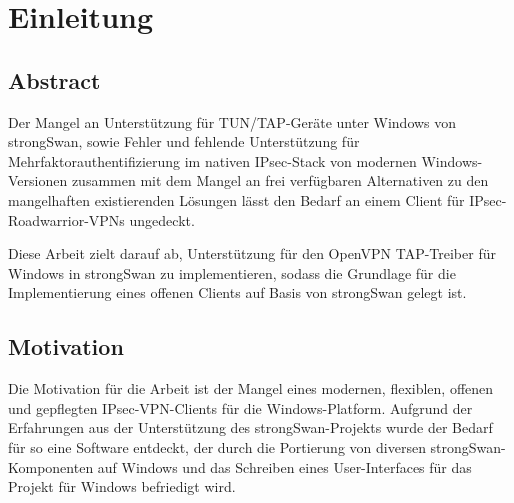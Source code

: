 


\section{Einleitung}
\subsection{Abstract}
Der Mangel an Unterstützung für TUN/TAP-Geräte unter Windows von strongSwan, sowie Fehler und
fehlende Unterstützung für Mehrfaktorauthentifizierung im nativen IPsec-Stack von modernen
Windows-Versionen zusammen mit dem Mangel an frei verfügbaren Alternativen zu den mangelhaften existierenden Lösungen
lässt den Bedarf an einem Client für IPsec-Roadwarrior-VPNs ungedeckt.

Diese Arbeit zielt darauf ab, Unterstützung für den OpenVPN TAP-Treiber
für Windows in strongSwan zu implementieren, sodass die Grundlage für die Implementierung
eines offenen Clients auf Basis von strongSwan gelegt ist.

\subsection{Motivation}
Die Motivation für die Arbeit ist der Mangel eines modernen, flexiblen, offenen
und  gepflegten IPsec-VPN-Clients für die Windows-Platform.
Aufgrund der Erfahrungen aus der Unterstützung des strongSwan-Projekts wurde
der Bedarf für so eine Software entdeckt, der durch die Portierung von diversen
strongSwan-Komponenten auf Windows und das Schreiben eines User-Interfaces
für das Projekt für Windows befriedigt wird.

\BlankPage
{}

